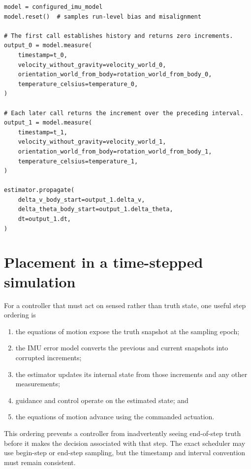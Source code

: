 \documentclass[11pt,oneside,headings=big]{scrreprt}
\begin{document}
    \begin{lstlisting}[style=imuPython,caption={Conceptual integration with a truth-producing simulation.},label={lst:integration}]
model = configured_imu_model
model.reset()  # samples run-level bias and misalignment

# The first call establishes history and returns zero increments.
output_0 = model.measure(
    timestamp=t_0,
    velocity_without_gravity=velocity_world_0,
    orientation_world_from_body=rotation_world_from_body_0,
    temperature_celsius=temperature_0,
)

# Each later call returns the increment over the preceding interval.
output_1 = model.measure(
    timestamp=t_1,
    velocity_without_gravity=velocity_world_1,
    orientation_world_from_body=rotation_world_from_body_1,
    temperature_celsius=temperature_1,
)

estimator.propagate(
    delta_v_body_start=output_1.delta_v,
    delta_theta_body_start=output_1.delta_theta,
    dt=output_1.dt,
)
    \end{lstlisting}


    \section{Placement in a time-stepped simulation}
    For a controller that must act on sensed rather than truth state, one useful step
    ordering is
    \begin{enumerate}
        \item the equations of motion expose the truth snapshot at the sampling epoch;
        \item the IMU error model converts the previous and current snapshots into
        corrupted increments;
        \item the estimator updates its internal state from those increments and any
        other measurements;
        \item guidance and control operate on the estimated state; and
        \item the equations of motion advance using the commanded actuation.
    \end{enumerate}
    This ordering prevents a controller from inadvertently seeing end-of-step truth
    before it makes the decision associated with that step. The exact scheduler may
    use begin-step or end-step sampling, but the timestamp and interval convention
    must remain consistent.
\end{document}
